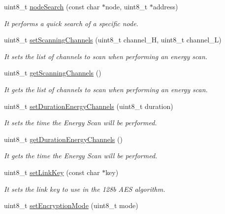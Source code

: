 \begin{DoxyCompactItemize}
uint8\+\_\+t \hyperlink{class_wasp_x_bee_core_afb7230ca0abe91feb4e38bf2286114bb}{node\+Search} (const char $\ast$node, uint8\+\_\+t $\ast$address)
\begin{DoxyCompactList}\small\item\em It performs a quick search of a specific node. \end{DoxyCompactList}\item 
uint8\+\_\+t \hyperlink{class_wasp_x_bee_core_af33faabe269c23967bfe831cc67cc00f}{set\+Scanning\+Channels} (uint8\+\_\+t channel\+\_\+H, uint8\+\_\+t channel\+\_\+L)
\begin{DoxyCompactList}\small\item\em It sets the list of channels to scan when performing an energy scan. \end{DoxyCompactList}\item 
uint8\+\_\+t \hyperlink{class_wasp_x_bee_core_ab5aca3963bb762901e109628392fd97d}{get\+Scanning\+Channels} ()
\begin{DoxyCompactList}\small\item\em It gets the list of channels to scan when performing an energy scan. \end{DoxyCompactList}\item 
uint8\+\_\+t \hyperlink{class_wasp_x_bee_core_a214cddb596c40692b1ee3fb2b570d55b}{set\+Duration\+Energy\+Channels} (uint8\+\_\+t duration)
\begin{DoxyCompactList}\small\item\em It sets the time the Energy Scan will be performed. \end{DoxyCompactList}\item 
uint8\+\_\+t \hyperlink{class_wasp_x_bee_core_a808a17d7d24300e29760679515dabff5}{get\+Duration\+Energy\+Channels} ()
\begin{DoxyCompactList}\small\item\em It gets the time the Energy Scan will be performed. \end{DoxyCompactList}\item 
uint8\+\_\+t \hyperlink{class_wasp_x_bee_core_a56e1a27c3b8a4a38677d7df803ccabe6}{set\+Link\+Key} (const char $\ast$key)
\begin{DoxyCompactList}\small\item\em It sets the link key to use in the 128b A\+ES algorithm. \end{DoxyCompactList}\item 
uint8\+\_\+t \hyperlink{class_wasp_x_bee_core_af1c97e77ba8d5de9544bc7742ab6345d}{set\+Encryption\+Mode} (uint8\+\_\+t mode)

\end{DoxyCompactItemize}
